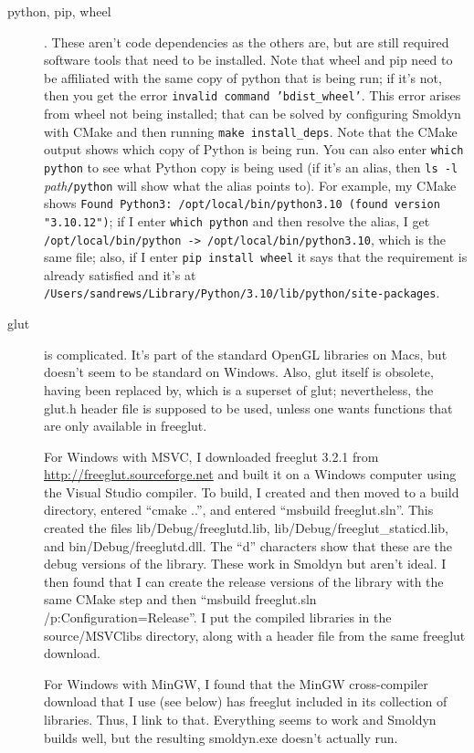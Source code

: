 \documentclass {scrbook}
\newcommand {\ttt} {\texttt}
\begin{document}
\begin{description}

\item[python, pip, wheel]. These aren't code dependencies as the others are, but are still required software tools that need to be installed. Note that wheel and pip need to be affiliated with the same copy of python that is being run; if it's not, then you get the error \ttt{invalid command 'bdist\_wheel'}. This error arises from wheel not being installed; that can be solved by configuring Smoldyn with CMake and then running \ttt{make install\_deps}. Note that the CMake output shows which copy of Python is being run. You can also enter \ttt{which python} to see what Python copy is being used (if it's an alias, then \ttt{ls -l} \textit{path}\ttt{/python} will show what the alias points to). For example, my CMake shows \ttt{Found Python3: /opt/local/bin/python3.10 (found version "3.10.12")}; if I enter \ttt{which python} and then resolve the alias, I get \ttt{/opt/local/bin/python -> /opt/local/bin/python3.10}, which is the same file; also, if I enter \ttt{pip install wheel} it says that the requirement is already satisfied and it's at \ttt{/Users/sandrews/Library/Python/3.10/lib/python/site-packages}.

\item[glut] is complicated. It's part of the standard OpenGL libraries on Macs, but doesn't seem to be standard on Windows. Also, glut itself is obsolete, having been replaced by, which is a superset of glut; nevertheless, the glut.h header file is supposed to be used, unless one wants functions that are only available in freeglut.

For Windows with MSVC, I downloaded freeglut 3.2.1 from \url{http://freeglut.sourceforge.net} and built it on a Windows computer using the Visual Studio compiler. To build, I created and then moved to a build directory, entered ``cmake ..'', and entered ``msbuild freeglut.sln''. This created the files lib/Debug/freeglutd.lib, lib/Debug/freeglut\_staticd.lib, and bin/Debug/freeglutd.dll. The ``d'' characters show that these are the debug versions of the library. These work in Smoldyn but aren't ideal. I then found that I can create the release versions of the library with the same CMake step and then ``msbuild freeglut.sln /p:Configuration=Release''. I put the compiled libraries in the source/MSVClibs directory, along with a header file from the same freeglut download.

For Windows with MinGW, I found that the MinGW cross-compiler download that I use (see below) has freeglut included in its collection of libraries. Thus, I link to that. Everything seems to work and Smoldyn builds well, but the resulting smoldyn.exe doesn't actually run.


\end{description}
\end{document}
